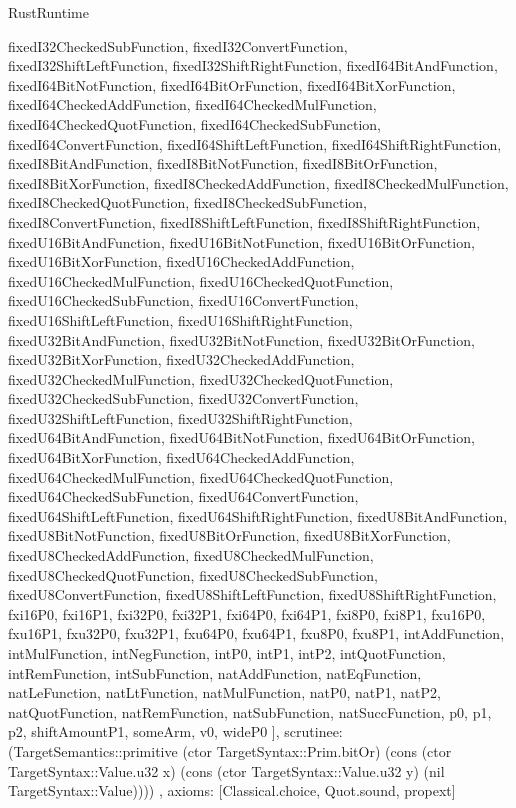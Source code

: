 \begin{lexlean}{RustRuntime}
\begin{semanticmodule}
{{      fixedI32CheckedSubFunction,
      fixedI32ConvertFunction,
      fixedI32ShiftLeftFunction,
      fixedI32ShiftRightFunction,
      fixedI64BitAndFunction,
      fixedI64BitNotFunction,
      fixedI64BitOrFunction,
      fixedI64BitXorFunction,
      fixedI64CheckedAddFunction,
      fixedI64CheckedMulFunction,
      fixedI64CheckedQuotFunction,
      fixedI64CheckedSubFunction,
      fixedI64ConvertFunction,
      fixedI64ShiftLeftFunction,
      fixedI64ShiftRightFunction,
      fixedI8BitAndFunction,
      fixedI8BitNotFunction,
      fixedI8BitOrFunction,
      fixedI8BitXorFunction,
      fixedI8CheckedAddFunction,
      fixedI8CheckedMulFunction,
      fixedI8CheckedQuotFunction,
      fixedI8CheckedSubFunction,
      fixedI8ConvertFunction,
      fixedI8ShiftLeftFunction,
      fixedI8ShiftRightFunction,
      fixedU16BitAndFunction,
      fixedU16BitNotFunction,
      fixedU16BitOrFunction,
      fixedU16BitXorFunction,
      fixedU16CheckedAddFunction,
      fixedU16CheckedMulFunction,
      fixedU16CheckedQuotFunction,
      fixedU16CheckedSubFunction,
      fixedU16ConvertFunction,
      fixedU16ShiftLeftFunction,
      fixedU16ShiftRightFunction,
      fixedU32BitAndFunction,
      fixedU32BitNotFunction,
      fixedU32BitOrFunction,
      fixedU32BitXorFunction,
      fixedU32CheckedAddFunction,
      fixedU32CheckedMulFunction,
      fixedU32CheckedQuotFunction,
      fixedU32CheckedSubFunction,
      fixedU32ConvertFunction,
      fixedU32ShiftLeftFunction,
      fixedU32ShiftRightFunction,
      fixedU64BitAndFunction,
      fixedU64BitNotFunction,
      fixedU64BitOrFunction,
      fixedU64BitXorFunction,
      fixedU64CheckedAddFunction,
      fixedU64CheckedMulFunction,
      fixedU64CheckedQuotFunction,
      fixedU64CheckedSubFunction,
      fixedU64ConvertFunction,
      fixedU64ShiftLeftFunction,
      fixedU64ShiftRightFunction,
      fixedU8BitAndFunction,
      fixedU8BitNotFunction,
      fixedU8BitOrFunction,
      fixedU8BitXorFunction,
      fixedU8CheckedAddFunction,
      fixedU8CheckedMulFunction,
      fixedU8CheckedQuotFunction,
      fixedU8CheckedSubFunction,
      fixedU8ConvertFunction,
      fixedU8ShiftLeftFunction,
      fixedU8ShiftRightFunction,
      fxi16P0,
      fxi16P1,
      fxi32P0,
      fxi32P1,
      fxi64P0,
      fxi64P1,
      fxi8P0,
      fxi8P1,
      fxu16P0,
      fxu16P1,
      fxu32P0,
      fxu32P1,
      fxu64P0,
      fxu64P1,
      fxu8P0,
      fxu8P1,
      intAddFunction,
      intMulFunction,
      intNegFunction,
      intP0,
      intP1,
      intP2,
      intQuotFunction,
      intRemFunction,
      intSubFunction,
      natAddFunction,
      natEqFunction,
      natLeFunction,
      natLtFunction,
      natMulFunction,
      natP0,
      natP1,
      natP2,
      natQuotFunction,
      natRemFunction,
      natSubFunction,
      natSuccFunction,
      p0,
      p1,
      p2,
      shiftAmountP1,
      someArm,
      v0,
      wideP0
    ],
    scrutinee: (TargetSemantics::primitive (ctor TargetSyntax::Prim.bitOr) (cons (ctor TargetSyntax::Value.u32 x) (cons (ctor TargetSyntax::Value.u32 y) (nil TargetSyntax::Value))))
  },
  axioms: [Classical.choice, Quot.sound, propext]
}


\end{semanticmodule}
\end{lexlean}

